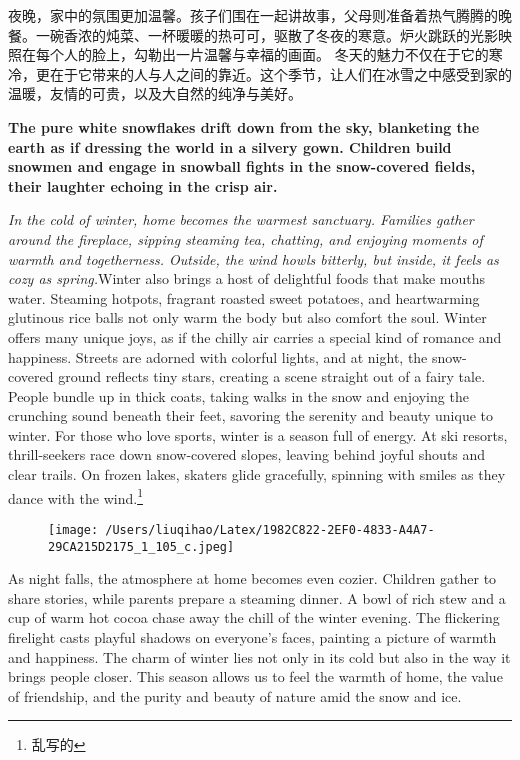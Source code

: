 \documentclass{article} %
\begin{document}
{ %
夜晚，家中的氛围更加温馨。孩子们围在一起讲故事，父母则准备着热气腾腾的晚餐。一碗香浓的炖菜、一杯暖暖的热可可，驱散了冬夜的寒意。炉火跳跃的光影映照在每个人的脸上，勾勒出一片温馨与幸福的画面。}
{\songti
冬天的魅力不仅在于它的寒冷，更在于它带来的人与人之间的靠近。}这个季节，让人们在冰雪之中感受到家的温暖，友情的可贵，以及大自然的纯净与美好。\par
{\bfseries %
\newpage %
The pure white snowflakes drift down from the sky, blanketing the earth as if dressing the world in a silvery gown. Children build snowmen and engage in snowball fights in the snow-covered fields, their laughter echoing in the crisp air.}\par
{\itshape
In the cold of winter, home becomes the warmest sanctuary. Families gather around the fireplace, sipping steaming tea, chatting, and enjoying moments of warmth and togetherness. Outside, the wind howls bitterly, but inside, it feels as cozy as spring.}\textsf{Winter also brings a host of delightful foods that make mouths water.} Steaming hotpots, fragrant roasted sweet potatoes, and heartwarming glutinous rice balls not only warm the body but also comfort the soul.
Winter offers many unique joys, as if the chilly air carries a special kind of romance and happiness. Streets are adorned with colorful lights, and at night, the snow-covered ground reflects tiny stars, creating a scene straight out of a fairy tale. People bundle up in thick coats, taking walks in the snow and enjoying the crunching sound beneath their feet, savoring the serenity and beauty unique to winter.
For those who love sports, winter is a season full of energy. At ski resorts, thrill-seekers race down snow-covered slopes, leaving behind joyful shouts and clear trails. On frozen lakes, skaters glide gracefully, spinning with smiles as they dance with the wind.\footnote{乱写的} %
\begin{figure}[t]
    \centering
    \texttt{[image: /Users/liuqihao/Latex/1982C822-2EF0-4833-A4A7-29CA215D2175\_1\_105\_c.jpeg]} %

\end{figure}


As night falls, the atmosphere at home becomes even cozier. Children gather to share stories, while parents prepare a steaming dinner. A bowl of rich stew and a cup of warm hot cocoa chase away the chill of the winter evening. The flickering firelight casts playful shadows on everyone’s faces, painting a picture of warmth and happiness.
The charm of winter lies not only in its cold but also in the way it brings people closer. This season allows us to feel the warmth of home, the value of friendship, and the purity and beauty of nature amid the snow and ice.
\end{document}

